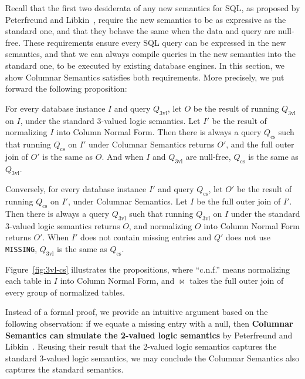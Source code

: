 \documentclass[sigconf,nonacm]{acmart}
\begin{document}
Recall that the first two desiderata of any new semantics for SQL, 
 as proposed by Peterfreund and Libkin~\cite{DBLP:conf/pods/LibkinP23},
 require the new semantics to be as expressive as the standard one,
 and that they behave the same when the data and query are null-free.
These requirements ensure every SQL query can be expressed in the 
 new semantics, 
 and that we can always compile queries in the new semantics into the standard one,
 to be executed by existing database engines.
In this section, we show Columnar Semantics satisfies both requirements.
More precisely, we put forward the following proposition:
%
\begin{proposition}
\label{prop:cs-eq-3vl}
For every database instance $I$ and query $Q_\text{3vl}$,
 let $O$ be the result of running $Q_\text{3vl}$ on $I$, 
 under the standard 3-valued logic semantics.
Let $I'$ be the result of normalizing $I$ into Column Normal Form.
Then there is always a query $Q_\text{cs}$ such that
 running $Q_\text{cs}$ on $I'$ under Columnar Semantics returns $O'$,
 and the full outer join of $O'$ is the same as $O$.
And when $I$ and $Q_\text{3vl}$ are null-free, $Q_\text{cs}$ 
 is the same as $Q_\text{3vl}$.
\end{proposition}
%
\begin{proposition}
\label{prop:3vl-eq-cs}
Conversely, for every database instance $I'$ and query $Q_\text{cs}$,
 let $O'$ be the result of running $Q_\text{cs}$ on $I'$, 
 under Columnar Semantics.
Let $I$ be the full outer join of $I'$.
Then there is always a query $Q_\text{3vl}$ such that
 running $Q_\text{3vl}$ on $I$ under the standard 3-valued logic semantics returns $O$,
 and normalizing $O$ into Column Normal Form returns $O'$.
When $I'$ does not contain missing entries and $Q'$ does not use \lstinline|MISSING|,
 $Q_\text{3vl}$ is the same as $Q_\text{cs}$.
\end{proposition}
%
Figure~\ref{fig:3vl-cs} illustrates the propositions, 
 where ``c.n.f.'' means normalizing each table in $I$ into Column Normal Form,
 and $\Join$ takes the full outer join of every group of normalized tables.

Instead of a formal proof, 
 we provide an intuitive argument based on the following observation:
 if we equate a missing entry with a null,
 then \textbf{Columnar Semantics can simulate the 2-valued logic semantics} 
 by Peterfreund and Libkin~\cite{DBLP:conf/pods/LibkinP23}.
Reusing their result that the 2-valued logic semantics
 captures the standard 3-valued logic semantics,
 we may conclude the Columnar Semantics also captures the standard semantics.
\end{document}
